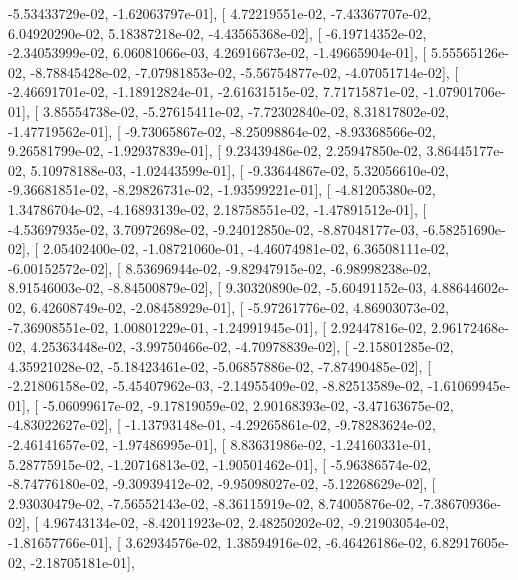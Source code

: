 \documentclass{article}
\begin{document}
         -5.53433729e-02,  -1.62063797e-01],
       [  4.72219551e-02,  -7.43367707e-02,   6.04920290e-02,
          5.18387218e-02,  -4.43565368e-02],
       [ -6.19714352e-02,  -2.34053999e-02,   6.06081066e-03,
          4.26916673e-02,  -1.49665904e-01],
       [  5.55565126e-02,  -8.78845428e-02,  -7.07981853e-02,
         -5.56754877e-02,  -4.07051714e-02],
       [ -2.46691701e-02,  -1.18912824e-01,  -2.61631515e-02,
          7.71715871e-02,  -1.07901706e-01],
       [  3.85554738e-02,  -5.27615411e-02,  -7.72302840e-02,
          8.31817802e-02,  -1.47719562e-01],
       [ -9.73065867e-02,  -8.25098864e-02,  -8.93368566e-02,
          9.26581799e-02,  -1.92937839e-01],
       [  9.23439486e-02,   2.25947850e-02,   3.86445177e-02,
          5.10978188e-03,  -1.02443599e-01],
       [ -9.33644867e-02,   5.32056610e-02,  -9.36681851e-02,
         -8.29826731e-02,  -1.93599221e-01],
       [ -4.81205380e-02,   1.34786704e-02,  -4.16893139e-02,
          2.18758551e-02,  -1.47891512e-01],
       [ -4.53697935e-02,   3.70972698e-02,  -9.24012850e-02,
         -8.87048177e-03,  -6.58251690e-02],
       [  2.05402400e-02,  -1.08721060e-01,  -4.46074981e-02,
          6.36508111e-02,  -6.00152572e-02],
       [  8.53696944e-02,  -9.82947915e-02,  -6.98998238e-02,
          8.91546003e-02,  -8.84500879e-02],
       [  9.30320890e-02,  -5.60491152e-03,   4.88644602e-02,
          6.42608749e-02,  -2.08458929e-01],
       [ -5.97261776e-02,   4.86903073e-02,  -7.36908551e-02,
          1.00801229e-01,  -1.24991945e-01],
       [  2.92447816e-02,   2.96172468e-02,   4.25363448e-02,
         -3.99750466e-02,  -4.70978839e-02],
       [ -2.15801285e-02,   4.35921028e-02,  -5.18423461e-02,
         -5.06857886e-02,  -7.87490485e-02],
       [ -2.21806158e-02,  -5.45407962e-03,  -2.14955409e-02,
         -8.82513589e-02,  -1.61069945e-01],
       [ -5.06099617e-02,  -9.17819059e-02,   2.90168393e-02,
         -3.47163675e-02,  -4.83022627e-02],
       [ -1.13793148e-01,  -4.29265861e-02,  -9.78283624e-02,
         -2.46141657e-02,  -1.97486995e-01],
       [  8.83631986e-02,  -1.24160331e-01,   5.28775915e-02,
         -1.20716813e-02,  -1.90501462e-01],
       [ -5.96386574e-02,  -8.74776180e-02,  -9.30939412e-02,
         -9.95098027e-02,  -5.12268629e-02],
       [  2.93030479e-02,  -7.56552143e-02,  -8.36115919e-02,
          8.74005876e-02,  -7.38670936e-02],
       [  4.96743134e-02,  -8.42011923e-02,   2.48250202e-02,
         -9.21903054e-02,  -1.81657766e-01],
       [  3.62934576e-02,   1.38594916e-02,  -6.46426186e-02,
          6.82917605e-02,  -2.18705181e-01],
\end{document}
